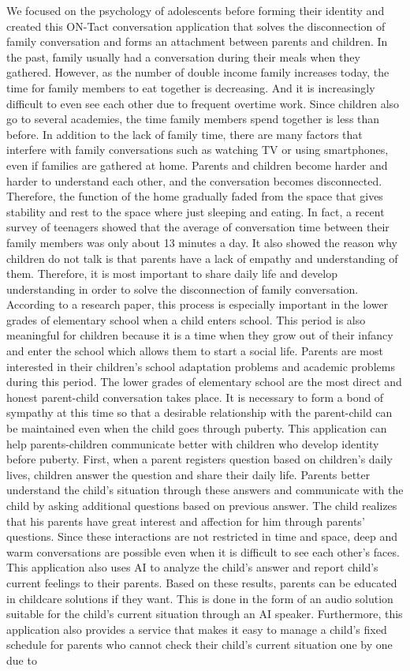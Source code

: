 \documentclass[conference]{IEEEtran}
\begin{document}
We focused on the psychology of adolescents before forming their identity and created this ON-Tact conversation application that solves the disconnection of family conversation and forms an attachment between parents and children. In the past, family usually had a conversation during their meals when they gathered. However, as the number of double income family increases today, the time for family members to eat together is decreasing. And it is increasingly difficult to even see each other due to frequent overtime work. Since children also go to several academies, the time family members spend together is less than before. In addition to the lack of family time, there are many factors that interfere with family conversations such as watching TV or using smartphones, even if families are gathered at home. Parents and children become harder and harder to understand each other, and the conversation becomes disconnected. Therefore, the function of the home gradually faded from the space that gives stability and rest to the space where just sleeping and eating. In fact, a recent survey of teenagers showed that the average of conversation time between their family members was only about 13 minutes a day. It also showed the reason why children do not talk is that parents have a lack of empathy and understanding of them. Therefore, it is most important to share daily life and develop understanding in order to solve the disconnection of family conversation. According to a research paper, this process is especially important in the lower grades of elementary school when a child enters school. This period is also meaningful for children because it is a time when they grow out of their infancy and enter the school which allows them to start a social life. Parents are most interested in their children's school adaptation problems and academic problems during this period. The lower grades of elementary school are the most direct and honest parent-child conversation takes place. It is necessary to form a bond of sympathy at this time so that a desirable relationship with the parent-child can be maintained even when the child goes through puberty. This application can help parents-children communicate better with children who develop identity before puberty. First, when a parent registers question based on children's daily lives, children answer the question and share their daily life. Parents better understand the child's situation through these answers and communicate with the child by asking additional questions based on previous answer. The child realizes that his parents have great interest and affection for him through parents' questions. Since these interactions are not restricted in time and space, deep and warm conversations are possible even when it is difficult to see each other's faces. This application also uses AI to analyze the child's answer and report child’s current feelings to their parents. Based on these results, parents can be educated in childcare solutions if they want. This is done in the form of an audio solution suitable for the child's current situation through an AI speaker. Furthermore, this application also provides a service that makes it easy to manage a child's fixed schedule for parents who cannot check their child's current situation one by one due to 
\end{document}
